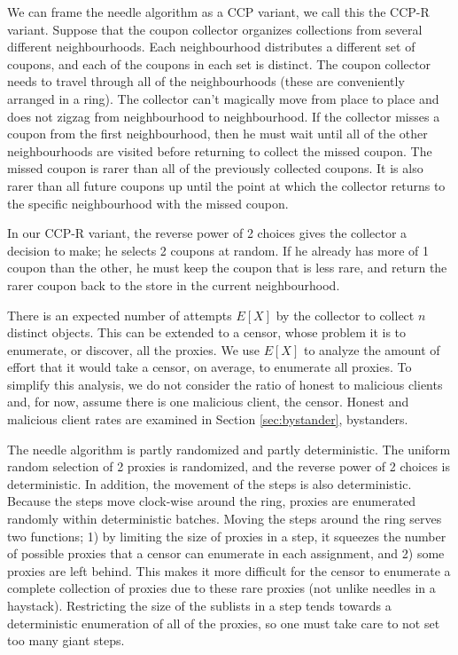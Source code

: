 We can frame the needle algorithm as a \ac{CCP} variant, we call this the \ac{CCP-R} variant. Suppose that the coupon collector organizes collections from several different neighbourhoods. Each neighbourhood distributes a different set of coupons, and each of the coupons in each set is distinct. The coupon collector needs to travel through all of the neighbourhoods (these are conveniently arranged in a ring). The collector can't magically move from place to place and does not zigzag from neighbourhood to neighbourhood. If the collector misses a coupon from the first neighbourhood, then he must wait until all of the other neighbourhoods are visited before returning to collect the missed coupon. The missed coupon is rarer than all of the previously collected coupons. It is also rarer than all future coupons up until the point at which the collector returns to the specific neighbourhood with the missed coupon.

In our \ac{CCP-R} variant, the reverse power of 2 choices gives the collector a decision to make; he selects 2 coupons at random. If he already has more of 1 coupon than the other, he must keep the coupon that is less rare, and return the rarer coupon back to the store in the current neighbourhood. 

There is an expected number of attempts $E[X]$ by the collector to collect $n$ distinct objects. This can be extended to a censor, whose problem it is to enumerate, or discover, all the proxies. We use $E[X]$ to analyze the amount of effort that it would take a censor, on average, to enumerate all proxies. To simplify this analysis, we do not consider the ratio of honest to malicious clients and, for now, assume there is one malicious client, the censor. Honest and malicious client rates are examined in Section \ref{sec:bystander}, bystanders.

The needle algorithm is partly randomized and partly deterministic. The uniform random selection of 2 proxies is randomized, and the reverse power of 2 choices is deterministic. In addition, the movement of the steps is also deterministic. Because the steps move clock-wise around the ring, proxies are enumerated randomly within deterministic batches. Moving the steps around the ring serves two functions; 1) by limiting the size of proxies in a step, it squeezes the number of possible proxies that a censor can enumerate in each assignment, and 2) some proxies are left behind. This makes it more difficult for the censor to enumerate a complete collection of proxies due to these rare proxies (not unlike needles in a haystack). Restricting the size of the sublists in a step tends towards a deterministic enumeration of all of the proxies, so one must take care to not set too many giant steps. 

